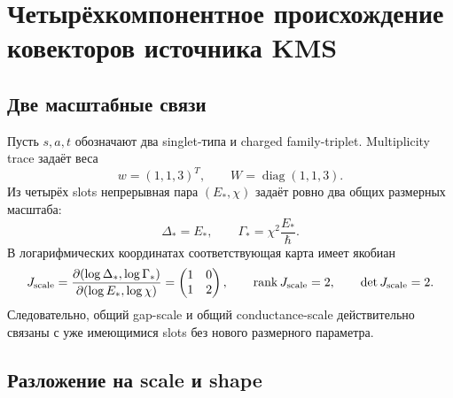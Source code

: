 \chapter{Четырёхкомпонентное происхождение ковекторов источника KMS}
\label{ch:v9-endpoint-kms-source-covector-origin}

\section{Две масштабные связи}

Пусть $s,a,t$ обозначают два singlet-типа и charged family-triplet.
Multiplicity trace задаёт веса
\begin{equation}
 w=(1,1,3)^T,
 \qquad W=\operatorname{diag}(1,1,3).
 \label{eq:v9-kms-covector-origin-weights}
\end{equation}
Из четырёх slots непрерывная пара $(E_*,\chi)$ задаёт ровно два общих
размерных масштаба:
\begin{equation}
 \Delta_*=E_*,
 \qquad
 \Gamma_*=\chi^2\frac{E_*}{\hbar}.
 \label{eq:v9-kms-covector-origin-common-scales}
\end{equation}
В логарифмических координатах соответствующая карта имеет якобиан
\begin{equation}
 J_{\rm scale}=
 \frac{\partial(\log\Delta_*,\log\Gamma_*)}
 {\partial(\log E_*,\log\chi)}
 =\begin{pmatrix}1&0\\1&2\end{pmatrix},
 \qquad \operatorname{rank} J_{\rm scale}=2,
 \qquad \det J_{\rm scale}=2.
 \label{eq:v9-kms-covector-origin-scale-jacobian}
\end{equation}
Следовательно, общий gap-scale и общий conductance-scale действительно
связаны с уже имеющимися slots без нового размерного параметра.

\section{Разложение на scale и shape}

